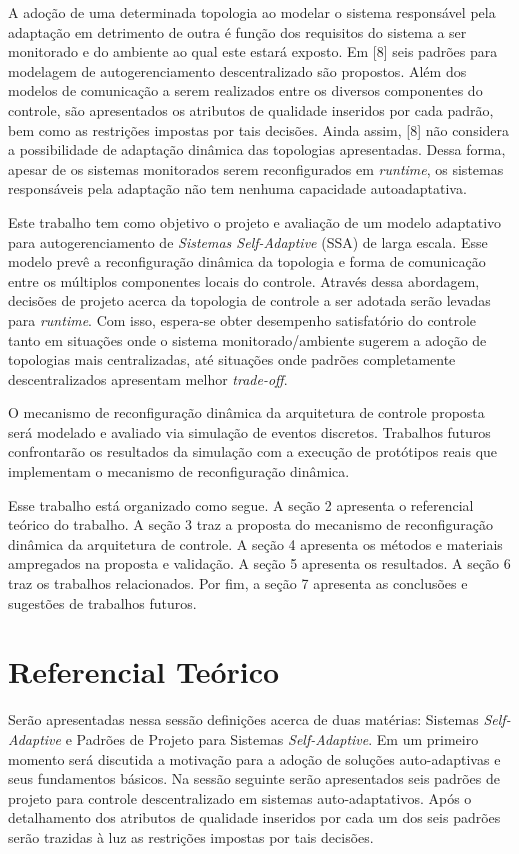 \documentclass[conference]{IEEEtran}
\begin{document}
A adoção de uma determinada topologia ao modelar o sistema responsável pela adaptação em detrimento de outra é função dos requisitos do sistema a ser monitorado e do ambiente ao qual este estará exposto. Em [8] seis padrões para modelagem de autogerenciamento descentralizado são propostos. Além dos modelos de comunicação a serem realizados entre os diversos componentes do controle, são apresentados os atributos de qualidade inseridos por cada padrão, bem como as restrições impostas por tais decisões. Ainda assim, [8] não considera a possibilidade de adaptação dinâmica das topologias apresentadas. Dessa forma, apesar de os sistemas monitorados serem reconfigurados em \textit{runtime}, os sistemas responsáveis pela adaptação não tem nenhuma capacidade autoadaptativa.

Este trabalho tem como objetivo o projeto e avaliação de um modelo adaptativo para autogerenciamento de \textit{Sistemas Self-Adaptive} (SSA) de larga escala. Esse modelo prevê a reconfiguração dinâmica da topologia e forma de comunicação entre os múltiplos componentes locais do controle. Através dessa abordagem, decisões de projeto acerca da topologia de controle a ser adotada serão levadas para \textit{runtime}. Com isso, espera-se obter desempenho satisfatório do controle tanto em situações onde o sistema monitorado/ambiente sugerem a adoção de topologias mais centralizadas, até situações onde padrões completamente descentralizados apresentam melhor \textit{trade-off}.

O mecanismo de reconfiguração dinâmica da arquitetura de controle proposta será modelado e avaliado via simulação de eventos discretos. Trabalhos futuros confrontarão os resultados da simulação com a execução de protótipos reais que implementam o mecanismo de reconfiguração dinâmica.

Esse trabalho está organizado como segue. A seção 2 apresenta o referencial teórico do trabalho. A seção 3 traz a proposta do mecanismo de reconfiguração dinâmica da arquitetura de controle. A seção 4 apresenta os métodos e materiais ampregados na proposta e validação. A seção 5 apresenta os resultados.  A seção 6 traz os trabalhos relacionados. Por fim, a seção 7 apresenta as conclusões e sugestões de trabalhos futuros.


\section{Referencial Teórico}

Serão apresentadas nessa sessão definições acerca de duas matérias: Sistemas \textit{Self-Adaptive} e Padrões de Projeto para Sistemas \textit{Self-Adaptive}. Em um primeiro momento será discutida a motivação para a adoção de soluções auto-adaptivas e seus fundamentos básicos. Na sessão seguinte serão apresentados seis padrões de projeto para controle descentralizado em sistemas auto-adaptativos. Após o detalhamento dos atributos de qualidade inseridos por cada um dos seis padrões serão trazidas à luz as restrições impostas por tais decisões.
\end{document}
